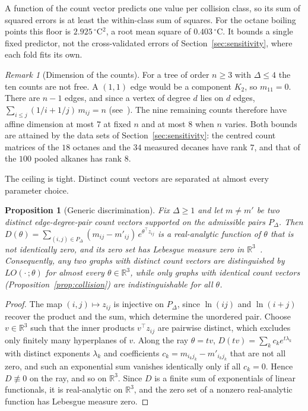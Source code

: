 \documentclass[a5paper, 10pt]{article}
\theoremstyle{plain}
\newtheorem{proposition}[theorem]{Proposition}
\theoremstyle{remark}
\newtheorem*{remark}{Remark}
\theoremstyle{definition}
\begin{document}
  A function of the count vector predicts one value per collision
  class, so its sum of squared errors is at least the within-class sum
  of squares. For the octane boiling points this floor is
  $2.925\,^{\circ}$C$^2$, a root mean square of $0.403\,^{\circ}$C. It
  bounds a single fixed predictor, not the cross-validated errors of
  Section~\ref{sec:sensitivity}, where each fold fits its own.

  \begin{remark}[Dimension of the counts]\label{rem:countdim}
  For a tree of order $n \ge 3$ with $\Delta \le 4$ the ten counts are
  not free. A $(1,1)$ edge would be a component $K_2$, so $m_{11} = 0$.
  There are $n - 1$ edges, and since a vertex of degree $d$ lies on $d$
  edges, $\sum_{i \le j} (1/i + 1/j)\,m_{ij} = n$ (see~\cite[eqs.~(3)--(4)]{CruzRada2019PathStar}). The nine remaining
  counts therefore have affine dimension at most $7$ at fixed $n$ and
  at most $8$ when $n$ varies. Both bounds are attained by the data
  sets of Section~\ref{sec:sensitivity}: the centred count matrices of
  the $18$ octanes and the $34$ measured decanes have rank $7$, and that
  of the $100$ pooled alkanes has rank $8$.
  \end{remark}

  The ceiling is tight. Distinct count vectors are separated at almost
  every parameter choice.

  \begin{proposition}[Generic discrimination]\label{prop:generic}
  Fix $\Delta \ge 1$ and let $m \neq m'$ be two distinct
  edge-degree-pair count vectors supported on the admissible pairs
  $P_{\Delta}$. Then
  $D(\theta) = \sum_{(i,j) \in P_{\Delta}} (m_{ij} - m'_{ij})\,
  e^{\theta^{\top} z_{ij}}$ is a real-analytic function of $\theta$
  that is not identically zero, and its zero set has Lebesgue measure zero in $\mathbb{R}^3$~\cite{Mityagin2020}. Consequently, any two graphs with distinct
  count vectors are distinguished by $LO(\cdot\,;\theta)$ for almost
  every $\theta \in \mathbb{R}^3$, while only graphs with identical count
  vectors (Proposition~\ref{prop:collision}) are indistinguishable
  for all $\theta$.
  \end{proposition}

  \begin{proof}
  The map $(i,j) \mapsto z_{ij}$ is injective on $P_{\Delta}$, since
  $\ln(ij)$ and $\ln(i+j)$ recover the product and the sum, which
  determine the unordered pair. Choose $v \in \mathbb{R}^3$ such that
  the inner products $v^{\top} z_{ij}$ are pairwise distinct, which
  excludes only finitely many hyperplanes of $v$. Along the ray
  $\theta = t v$, $D(tv) = \sum_k c_k e^{t \lambda_k}$ with distinct
  exponents $\lambda_k$ and coefficients
  $c_k = m_{i_kj_k} - m'_{i_kj_k}$ that are not all zero, and such an
  exponential sum vanishes identically only if all $c_k = 0$. Hence $D \not\equiv 0$
  on the ray, and so on $\mathbb{R}^3$. Since $D$ is a finite sum of
  exponentials of linear functionals, it is real-analytic on
  $\mathbb{R}^3$, and the zero set of a nonzero real-analytic
  function has Lebesgue measure zero.
  \end{proof}
\end{document}
